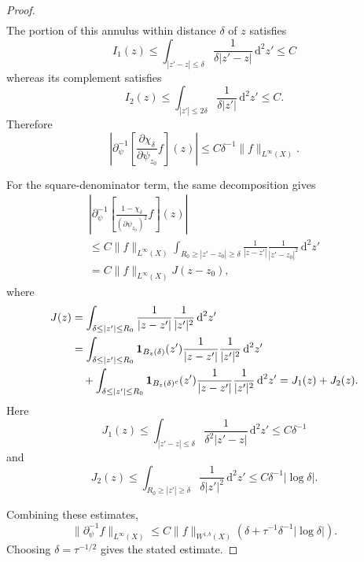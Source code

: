 \documentclass[a4paper,11pt]{article}
\newcommand{\pr}{\partial}
\newcommand{\psiz}{\psi_{z_0}}
\newcommand{\dd}{\,\text{d}}
\theoremstyle{plain}
\theoremstyle{definition}
\theoremstyle{remark}
\begin{document}
\begin{proof}
\begin{align}
\end{align}
The portion of this annulus within distance $\delta$ of $z$ satisfies
\begin{equation}
I_1(z)\leq\int_{|z'-z|\leq \delta}\frac{1}{\delta|z'-z|}\dd^2 z'\leq C
\end{equation}
whereas its complement satisfies
\begin{equation}
I_2(z)\leq \int_{|z'|\leq2\delta}\frac{1}{\delta|z'|}\dd^2 z'\leq C.
\end{equation}
Therefore
\begin{equation}
\left|\pr_\psi^{-1}\left[\frac{\pr \chi_\delta}{\pr\psiz} f  \right](z)\right|\leq C\delta^{-1}\|f\|_{L^\infty(X)}.
\end{equation}


For the square-denominator term, the same decomposition gives
\begin{multline}
\left|\pr_\psi^{-1}\left[\frac{1- \chi_\delta}{(\pr\psiz)^2} f  \right](z)\right|\\[5pt]
\leq C\|f\|_{L^\infty(X)}\int_{R_0\geq|z'-z_0|\geq\delta}\frac{1}{|z-z'|}\frac{1}{|z'-z_0|^2}\dd^2z'\\[5pt]
=C\|f\|_{L^\infty(X)}J(z-z_0),
\end{multline}
where 
\begin{align}
J(z)
&=\int_{\delta\leq|z'|\leq R_0}\frac{1}{|z-z'|}\frac{1}{|z'|^{2}}\dd^2z' \notag\\
&=\int_{\delta\leq|z'|\leq R_0}\mathbf{1}_{B_{z}(\delta)}(z')\frac{1}{|z-z'|}\frac{1}{|z'|^{2}}\dd^2z' \notag\\
&\quad +\int_{\delta\leq|z'|\leq R_0}\mathbf{1}_{B_{z}(\delta)^c}(z')\frac{1}{|z-z'|}\frac{1}{|z'|^{2}}\dd^2z'
=J_1(z)+J_2(z).
\end{align}
Here
\begin{equation}
J_1(z)\leq\int_{|z'-z|\leq \delta}\frac{1}{\delta^2|z'-z|}\dd^2 z'\leq C\delta^{-1}
\end{equation}
and
\begin{equation}
J_2(z)\leq \int_{R_0\geq|z'|\geq\delta}\frac{1}{\delta|z'|^2}\dd^2 z'\leq C\delta^{-1}|\log\delta|.
\end{equation}


Combining these estimates,
\begin{equation}
\|\pr_\psi^{-1}f\|_{L^\infty(X)}\leq C\|f\|_{W^{1,b}(X)}\left(\delta+\tau^{-1}\delta^{-1} |\log\delta| \right).
\end{equation}
Choosing $\delta=\tau^{-1/2}$ gives the stated estimate.
\end{proof}
\end{document}

